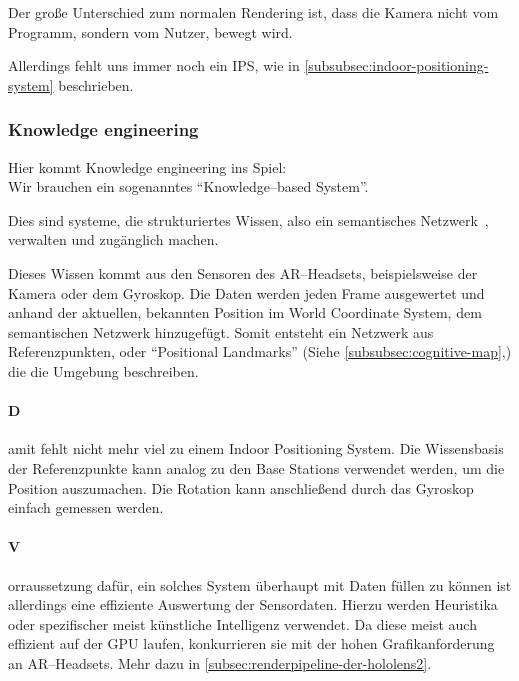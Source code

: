         Der große Unterschied zum normalen Rendering ist, dass die Kamera nicht vom Programm, sondern vom Nutzer, bewegt wird.

        Allerdings fehlt uns immer noch ein IPS, wie in \autoref{subsubsec:indoor-positioning-system} beschrieben.

    \subsubsection{Knowledge engineering}\label{subsubsec:knowledge-engineering}
        Hier kommt Knowledge engineering ins Spiel:\\
        Wir brauchen ein sogenanntes \enquote{Knowledge--based System}.~\autocite{wikipedia-contributors-2023C}

        Dies sind systeme, die strukturiertes Wissen, also ein semantisches Netzwerk~\autocite{wikipedia-contributors-2023K}, verwalten und zugänglich machen.

        Dieses Wissen kommt aus den Sensoren des AR--Headsets, beispielsweise der Kamera oder dem Gyroskop.
        Die Daten werden jeden Frame ausgewertet und anhand der aktuellen, bekannten Position im World Coordinate System, dem semantischen Netzwerk hinzugefügt.
        Somit entsteht ein Netzwerk aus Referenzpunkten, oder \enquote{Positional Landmarks} (Siehe \autoref{subsubsec:cognitive-map},) die die Umgebung beschreiben.

        \paragraph{D}amit fehlt nicht mehr viel zu einem Indoor Positioning System.
            Die Wissensbasis der Referenzpunkte kann analog zu den Base Stations verwendet werden, um die Position auszumachen.
            Die Rotation kann anschließend durch das Gyroskop einfach gemessen werden.

        \paragraph{V}orraussetzung dafür, ein solches System überhaupt mit Daten füllen zu können ist allerdings eine effiziente Auswertung der Sensordaten.
            Hierzu werden Heuristika oder spezifischer meist künstliche Intelligenz verwendet.
            Da diese meist auch effizient auf der GPU laufen, konkurrieren sie mit der hohen Grafikanforderung an AR--Headsets.
            Mehr dazu in \autoref{subsec:renderpipeline-der-hololens2}.

